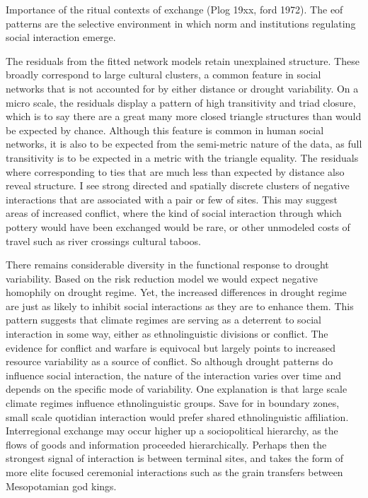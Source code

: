 \documentclass[10pt]{iopart}
\begin{document}
Importance of the ritual contexts of exchange (Plog 19xx, ford 1972). The eof patterns are the selective environment in which norm and institutions regulating social interaction emerge. 



The residuals from the fitted network models retain unexplained structure. These broadly correspond to large cultural clusters, a common feature in social networks that is not accounted for by either distance or drought variability. On a micro scale, the residuals display a pattern of high transitivity and triad closure, which is to say there are a great many more closed triangle structures than would be expected by chance. Although this feature is common in human social networks, it is also to be expected from the semi-metric nature of the data, as full transitivity is to be expected in a metric with the triangle equality. The residuals where corresponding to ties that are much less than expected by distance also reveal structure. I see strong directed and spatially discrete clusters of negative interactions that are associated with a pair or few of sites. This may suggest areas of increased conflict, where the kind of social interaction through which pottery would have been exchanged would be rare, or other unmodeled costs of travel such as river crossings cultural taboos. 

There remains considerable diversity in the functional response to drought variability. Based on the risk reduction model we would expect negative homophily on drought regime. Yet, the increased differences in drought regime are just as likely to inhibit social interactions as they are to enhance them. This pattern suggests that climate regimes are serving as a deterrent to social interaction in some way, either as ethnolinguistic divisions or conflict. The evidence for conflict and warfare is equivocal \parencite{Kohler2014TheSouthwest, leblanc} but largely points to increased resource variability as a source of conflict. So although drought patterns do influence social interaction, the nature of the interaction varies over time and depends on the specific mode of variability. One explanation is that large scale climate regimes influence ethnolinguistic groups. Save for in boundary zones, small scale quotidian interaction would prefer shared ethnolinguistic affiliation. Interregional exchange may occur higher up a sociopolitical hierarchy, as the flows of goods and information proceeded hierarchically. Perhaps then the strongest signal of interaction is between terminal sites, and takes the form of more elite focused ceremonial interactions such as the grain transfers between Mesopotamian god kings.
\end{document}
